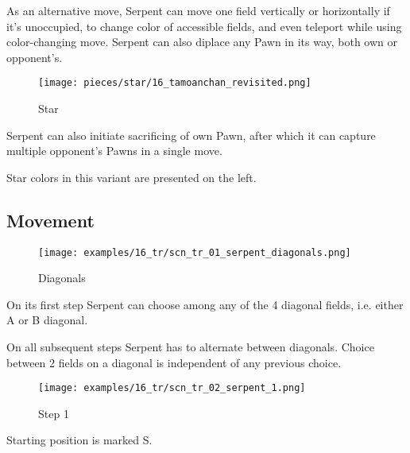 As an alternative move, Serpent can move one field vertically or horizontally
if it's unoccupied, to change color of accessible fields, and even teleport
while using color-changing move. Serpent can also diplace any Pawn in its way,
both own or opponent's.

\noindent
\begin{wrapfigure}{l}{0.4\textwidth}
\centering
\texttt{[image: pieces/star/16\_tamoanchan\_revisited.png]}
\caption{Star}
\label{fig:star/16_tamoanchan_revisited}
\end{wrapfigure}
Serpent can also initiate sacrificing of own Pawn, after which it can capture
multiple opponent's Pawns in a single move.

Star colors in this variant are presented on the left.

\clearpage %

\subsection*{Movement}
\label{sec:Tamoanchan Revisited/Serpent/Movement}

\vspace*{-0.7\baselineskip}
\noindent
\begin{wrapfigure}[8]{l}{0.4\textwidth}
\centering
\texttt{[image: examples/16\_tr/scn\_tr\_01\_serpent\_diagonals.png]}
\vspace*{-0.4\baselineskip}
\caption{Diagonals}
\label{fig:scn_tr_01_serpent_diagonals}
\end{wrapfigure}
On its first step Serpent can choose among any of the 4 diagonal fields,
i.e. either A or B diagonal.

On all subsequent steps Serpent has to alternate between diagonals.
Choice between 2 fields on a diagonal is independent of any previous choice.

\vspace*{1.4\baselineskip}
\noindent
\begin{wrapfigure}[5]{l}{0.4\textwidth}
\centering
\texttt{[image: examples/16\_tr/scn\_tr\_02\_serpent\_1.png]}
\vspace*{-0.4\baselineskip}
\caption{Step 1}
\label{fig:scn_tr_02_serpent_1}
\end{wrapfigure}
Starting position is marked S.

